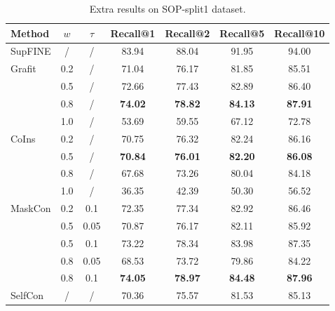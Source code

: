\documentclass[10pt,twocolumn,letterpaper]{article}
\begin{document}
\begin{table}[htbp]
\centering
\begin{tabular}{@{}l|c|c|cccc@{}}
\toprule
Method                  & $w$ & $\tau$ & Recall@1       & Recall@2       & Recall@5       & Recall@10      \\ \midrule
SupFINE                 & /   & /      & 83.94          & 88.04          & 91.95          & 94.00          \\ \midrule
\multirow{4}{*}{Grafit} & 0.2 & /      & 71.04          & 76.17          & 81.85          & 85.51          \\
                        & 0.5 & /      & 72.66          & 77.43          & 82.89          & 86.40          \\
                        & 0.8 & /      & \textbf{74.02} & \textbf{78.82} & \textbf{84.13} & \textbf{87.91} \\
                        & 1.0 & /      & 53.69          & 59.55          & 67.12          & 72.78          \\ \midrule
\multirow{4}{*}{CoIns}  & 0.2 & /      & 70.75          & 76.32          & 82.24          & 86.16          \\
                        & 0.5 & /      & \textbf{70.84} & \textbf{76.01} & \textbf{82.20} & \textbf{86.08} \\
                        & 0.8 & /      & 67.68          & 73.26          & 80.04          & 84.18          \\
                        & 1.0 & /      & 36.35          & 42.39          & 50.30          & 56.52          \\ \midrule
MaskCon                 & 0.2 & 0.1    & 72.35          & 77.34          & 82.92          & 86.46          \\
                        & 0.5 & 0.05   & 70.87          & 76.17          & 82.11          & 85.92          \\
                        & 0.5 & 0.1    & 73.22          & 78.34          & 83.98          & 87.35          \\
                        & 0.8 & 0.05   & 68.53          & 73.72          & 79.86          & 84.22          \\
                        & 0.8 & 0.1    & \textbf{74.05} & \textbf{78.97} & \textbf{84.48} & \textbf{87.96} \\ \midrule
SelfCon                 & /   & /      & 70.36          & 75.57          & 81.53          & 85.13          \\ \bottomrule
\end{tabular}
\caption{Extra results on SOP-split1 dataset.}
\label{tab:sop-split1}
\end{table}
\end{document}
